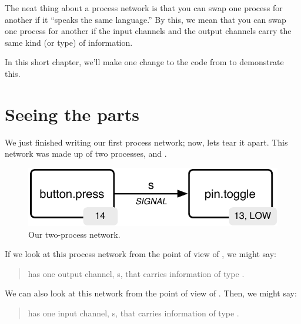 The neat thing about a process network is that you can swap one process for another if it ``speaks the same language.'' By this, we mean that you can swap one process for another if the input channels and the output channels carry the same kind (or type) of information. 

In this short chapter, we'll make one change to the code from  to demonstrate this. 

\section{Seeing the parts}
We just finished writing our first process network; now, lets tear it apart. This network was made up of two processes, \bp and \tp. 

\begin{figure}[ht]
  \begin{center}
    \includegraphics[width=0.8\linewidth]{images/ch4-button-toggle-led}
    \caption{Our two-process network.}
    \label{diagram:ch4-button-toggle-led-also-wik}
  \end{center}
\end{figure}

\newpage

If we look at this process network from the point of view of \bp, we might say:

\begin{quote}
	\bp has one {\strong output} channel, {\code s}, that carries information of type \SIGNALT.
\end{quote}

We can also look at this network from the point of view of \tp. Then, we might say:

\begin{quote}
	\bp has one {\strong input} channel, {\code s}, that carries information of type \SIGNALT.
\end{quote}

